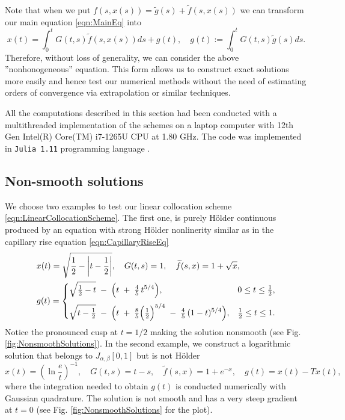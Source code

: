 \documentclass[12pt,a4paper]{article}
\begin{document}
Note that when we put $f(s, x(s)) = \widetilde{g}(s) + \widetilde{f}(s, x(s))$ we can transform our main equation \eqref{eqn:MainEq} into
\begin{equation}
	x(t) = \int_0^t G(t, s) \widetilde{f}(s, x(s)) ds + g(t), \quad g(t) := \int_0^t G(t, s) \widetilde{g}(s) ds.
\end{equation}
Therefore, without loss of generality, we can consider the above ''nonhonogeneous'' equation. This form allows us to construct exact solutions more easily and hence test our numerical methods without the need of estimating orders of convergence via extrapolation or similar techniques. 

All the computations described in this section had been conducted with a multithreaded implementation of the schemes on a laptop computer with 12th Gen Intel(R) Core(TM) i7-1265U CPU at 1.80 GHz. The code was implemented in \texttt{Julia 1.11} programming language \cite{bezanson2017julia}. 

\subsection{Non-smooth solutions}
We choose two examples to test our linear collocation scheme \eqref{eqn:LinearCollocationScheme}. The first one, is purely H\"older continuous produced by an equation with strong H\"older nonlinerity similar as in the capillary rise equation \eqref{eqn:CapillaryRiseEq}
\begin{equation}\label{eqn:NumericalHolder}
	\begin{split}
		&x(t) = \sqrt{\frac{1}{2}-\left|t-\frac{1}{2}\right|}, \quad G(t,s) = 1, \quad \widetilde{f}(s, x) = 1 + \sqrt{x}, \\
		&g(t) =
		\begin{cases}
			\displaystyle
			\sqrt{\tfrac12 - t}
			\;-\;\Bigl(t \;+\;\tfrac{4}{5}\,t^{5/4}\Bigr),
			&0 \le t \le \tfrac12,
			\\[2ex]
			\displaystyle
			\sqrt{t - \tfrac12}
			\;-\;\Bigl(t \;+\;\tfrac{8}{5}\Bigl(\tfrac12\Bigr)^{5/4}
			\;-\;\tfrac{4}{5}\,(1 - t)^{5/4}\Bigr),
			&\tfrac12 \le t \le 1.
		\end{cases}
	\end{split}
\end{equation}
Notice the pronounced cusp at $t=1/2$ making the solution nonsmooth (see Fig. \ref{fig:NonsmoothSolutions}). In the second example, we construct a logarithmic solution that belongs to $J_{\alpha,\beta}[0,1]$ but is not H\"older
\begin{equation}\label{eqn:NumericalLogarithm}
	x(t) = \left(\ln\frac{e}{t}\right)^{-1}, \quad G(t,s) = t-s, \quad \widetilde{f}(s,x) = 1+e^{-x}, \quad g(t) = x(t) - Tx(t),
\end{equation}
where the integration needed to obtain $g(t)$ is conducted numerically with Gaussian quadrature. The solution is not smooth and has a very steep gradient at $t = 0$ (see Fig. \ref{fig:NonsmoothSolutions} for the plot).  
\end{document}
